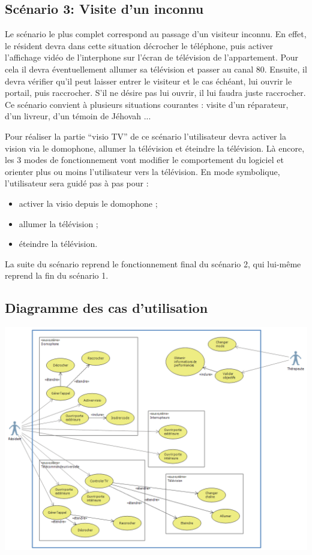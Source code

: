 \subsection{Scénario 3: Visite d'un inconnu}

Le scénario le plus complet correspond au passage d'un visiteur inconnu. En effet, le résident devra dans cette situation décrocher le téléphone, puis activer l'affichage vidéo de l'interphone sur l'écran de télévision de l'appartement. Pour cela il devra éventuellement allumer sa télévision et passer au canal 80. Ensuite, il devra vérifier qu'il peut laisser entrer le visiteur et le cas échéant, lui ouvrir le portail, puis raccrocher. S'il ne désire pas lui ouvrir, il lui faudra juste raccrocher.
Ce scénario convient à plusieurs situations courantes : visite d'un réparateur, d'un livreur, d'un témoin de Jéhovah ...

Pour réaliser la partie \enquote{visio TV} de ce scénario l'utilisateur devra activer la vision via le domophone, allumer la télévision et éteindre la télévision. Là encore, les 3 modes de fonctionnement vont modifier le comportement du logiciel et orienter plus ou moins l'utilisateur vers la télévision. En mode symbolique, l'utilisateur sera guidé pas à pas pour :
\begin{itemize}
	\item activer la visio depuis le domophone ;
	\item allumer la télévision ;
	\item éteindre la télévision.
\end{itemize}
La suite du scénario reprend le fonctionnement final du scénario 2, qui lui-même reprend la fin du scénario 1.

\subsection{Diagramme des cas d'utilisation}
\begin{center}
\includegraphics[width=\textwidth]{1-PreEtude/img/diagramme}
\end{center}
